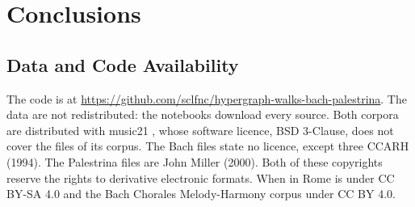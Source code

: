 \section{Conclusions}
\label{sec:conclusions}

\subsection{Data and Code Availability}
\label{sec:availability}
The code is at \url{https://github.com/sclfnc/hypergraph-walks-bach-palestrina}. The data are not redistributed: the notebooks download every source. Both corpora are distributed with music21 \cite{cuthbert2010, cuthbert2026music21}, whose software licence, BSD 3-Clause, does not cover the files of its corpus. The Bach files state no licence, except three \textcopyright{} CCARH (1994). The Palestrina files are \textcopyright{} John Miller (2000). Both of these copyrights reserve the rights to derivative electronic formats. When in Rome \cite{gotham2023, gotham2026wir} is under CC BY-SA 4.0 and the Bach Chorales Melody-Harmony corpus \cite{sears2023} under CC BY 4.0.
